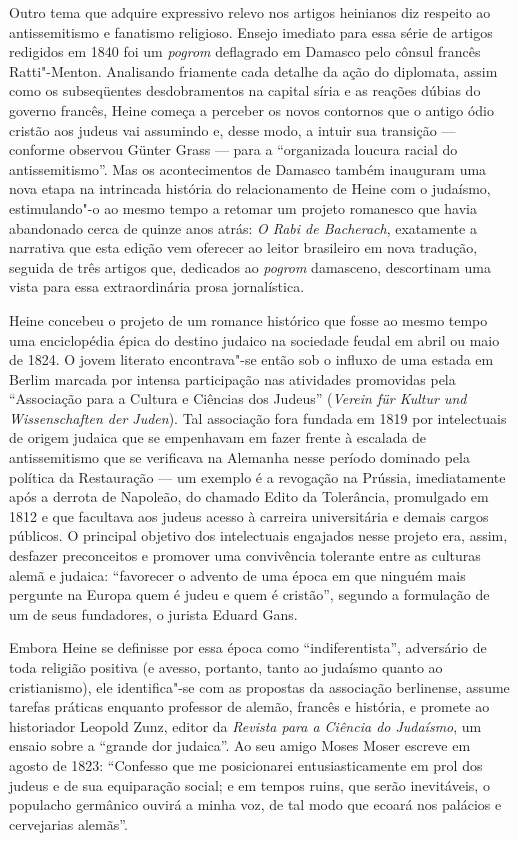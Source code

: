Outro tema que adquire expressivo relevo nos artigos heinianos diz
respeito ao antissemitismo e fanatismo religioso. Ensejo imediato
para essa série de artigos redigidos em 1840 foi um \textit{pogrom}
deflagrado em Damasco pelo cônsul francês Ratti"-Menton. Analisando
friamente cada detalhe da ação do diplomata, assim como os subseqüentes
desdobramentos na capital síria e as reações dúbias do governo francês,
Heine começa a perceber os novos contornos que o antigo ódio cristão
aos judeus vai assumindo e, desse modo, a intuir sua transição ---
conforme observou Günter Grass --- para a “organizada loucura racial do
antissemitismo”. Mas os acontecimentos de Damasco também inauguram
uma nova etapa na intrincada história do relacionamento de Heine com o
judaísmo, estimulando"-o ao mesmo tempo a retomar um projeto romanesco
que havia abandonado cerca de quinze anos atrás: \textit{O Rabi de
Bacherach}, exatamente a narrativa que esta edição vem oferecer ao
leitor brasileiro em nova tradução, seguida de três artigos que,
dedicados ao \textit{pogrom} damasceno, descortinam uma vista para essa
extraordinária prosa jornalística.

Heine concebeu o projeto de um romance histórico que fosse ao mesmo
tempo uma enciclopédia épica do destino judaico na sociedade feudal em
abril ou maio de 1824. O jovem literato encontrava"-se então sob o
influxo de uma estada em Berlim marcada por intensa participação nas
atividades promovidas pela “Associação para a Cultura e Ciências dos
Judeus” (\textit{Verein für Kultur und Wissenschaften der Juden}). Tal
associação fora fundada em 1819 por intelectuais de origem judaica que
se empenhavam em fazer frente à escalada de antissemitismo que se
verificava na Alemanha nesse período dominado pela política da
Restauração --- um exemplo é a revogação na Prússia, imediatamente após a
derrota de Napoleão, do chamado Edito da Tolerância, promulgado em 1812
e que facultava aos judeus acesso à carreira universitária e demais
cargos públicos. O principal objetivo dos intelectuais engajados nesse
projeto era, assim, desfazer preconceitos e promover uma convivência
tolerante entre as culturas alemã e judaica: “favorecer o advento de
uma época em que ninguém mais pergunte na Europa quem é judeu e quem é
cristão”, segundo a formulação de um de seus fundadores, o jurista
Eduard Gans.

Embora Heine se definisse por essa época como “indiferentista”,
adversário de toda religião positiva (e avesso, portanto, tanto ao
judaísmo quanto ao cristianismo), ele identifica"-se com as propostas
da associação berlinense, assume tarefas práticas enquanto professor de
alemão, francês e história, e promete ao historiador Leopold Zunz,
editor da \textit{Revista para a Ciência do Judaísmo}, um ensaio sobre
a “grande dor judaica”. Ao seu amigo Moses Moser escreve em agosto de
1823: “Confesso que me posicionarei entusiasticamente em prol dos
judeus e de sua equiparação social; e em tempos ruins, que serão
inevitáveis, o populacho germânico ouvirá a minha voz, de tal modo que
ecoará nos palácios e cervejarias alemãs”.

